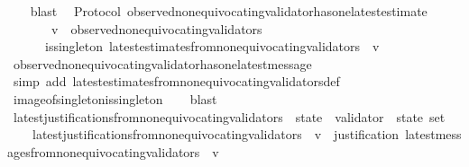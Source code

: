 \begin{isabellebody}
\ \ \isamarkupfalse%
\ blast%
\endisatagproof
{\isafoldproof}%
%
\isadelimproof
\isanewline
%
\endisadelimproof
\isanewline
{}\isamarkupfalse%
\ {\isacharparenleft}\ Protocol{\isacharparenright}\ observed{\isacharunderscore}non{\isacharunderscore}equivocating{\isacharunderscore}validator{\isacharunderscore}has{\isacharunderscore}one{\isacharunderscore}latest{\isacharunderscore}estimate\ {\isacharcolon}\ \isanewline
\ \ {\isachardoublequoteopen}{\isasymforall}\ {\isasymsigma}\ {\isasymin}\ {\isasymSigma}{\isachardot}\ {\isasymforall}\ v\ {\isasymin}\ observed{\isacharunderscore}non{\isacharunderscore}equivocating{\isacharunderscore}validators\ {\isasymsigma}{\isachardot}\isanewline
\ \ \ \ \ \ is{\isacharunderscore}singleton\ {\isacharparenleft}latest{\isacharunderscore}estimates{\isacharunderscore}from{\isacharunderscore}non{\isacharunderscore}equivocating{\isacharunderscore}validators\ {\isasymsigma}\ v{\isacharparenright}{\isachardoublequoteclose}\isanewline
%
\isadelimproof
\ \ %
\endisadelimproof
%
\isatagproof
{}\isamarkupfalse%
\ observed{\isacharunderscore}non{\isacharunderscore}equivocating{\isacharunderscore}validator{\isacharunderscore}has{\isacharunderscore}one{\isacharunderscore}latest{\isacharunderscore}message\isanewline
\ \ \isamarkupfalse%
\ {\isacharparenleft}simp\ add{\isacharcolon}\ latest{\isacharunderscore}estimates{\isacharunderscore}from{\isacharunderscore}non{\isacharunderscore}equivocating{\isacharunderscore}validators{\isacharunderscore}def{\isacharparenright}\isanewline
\ \ \isamarkupfalse%
\ image{\isacharunderscore}of{\isacharunderscore}singleton{\isacharunderscore}is{\isacharunderscore}singleton\isanewline
\ \ \isamarkupfalse%
\ blast%
\endisatagproof
{\isafoldproof}%
%
\isadelimproof
\isanewline
%
\endisadelimproof
\isanewline
\isanewline
\isanewline
\isanewline
\isanewline
{}\isamarkupfalse%
\ latest{\isacharunderscore}justifications{\isacharunderscore}from{\isacharunderscore}non{\isacharunderscore}equivocating{\isacharunderscore}validators\ {\isacharcolon}{\isacharcolon}\ {\isachardoublequoteopen}state\ {\isasymRightarrow}\ validator\ {\isasymRightarrow}\ state\ set{\isachardoublequoteclose}\isanewline
\ \ \isanewline
\ \ \ \ {\isachardoublequoteopen}latest{\isacharunderscore}justifications{\isacharunderscore}from{\isacharunderscore}non{\isacharunderscore}equivocating{\isacharunderscore}validators\ {\isasymsigma}\ v\ {\isacharequal}\ justification\ {\isacharbackquote}latest{\isacharunderscore}messages{\isacharunderscore}from{\isacharunderscore}non{\isacharunderscore}equivocating{\isacharunderscore}validators\ {\isasymsigma}\ v{\isachardoublequoteclose}\isanewline

\end{isabellebody}
